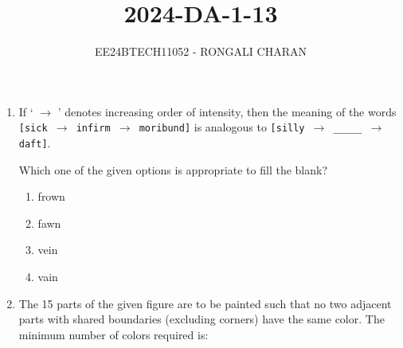 \documentclass[journal,12pt,onecolumn]{IEEEtran}
\theoremstyle{remark}
\begin{document}

\vspace{3cm}

\title{\textbf{2024-DA-1-13}}
\author{EE24BTECH11052 - RONGALI CHARAN}
\maketitle
\bigskip

\renewcommand{\thefigure}{\theenumi}
\renewcommand{\thetable}{\theenumi}
\setlength{\columnsep}{2.5em}\begin{enumerate}
\item If \textquoteleft{} $\rightarrow$ \textquoteright{} denotes increasing order of intensity, then the meaning of the words
\texttt{[sick $\rightarrow$ infirm $\rightarrow$ moribund]} is analogous to \texttt{[silly $\rightarrow$ \_\_\_\_\_ $\rightarrow$ daft]}.

Which one of the given options is appropriate to fill the blank?

\begin{enumerate}
    \item frown
    \item fawn
    \item vein
    \item vain
\end{enumerate}
\item The 15 parts of the given figure are to be painted such that no two adjacent parts with shared boundaries (excluding corners) have the same color. The minimum number of colors required is:
	\begin{center}
		
	\end{center}


\end{enumerate}
\end{document}

